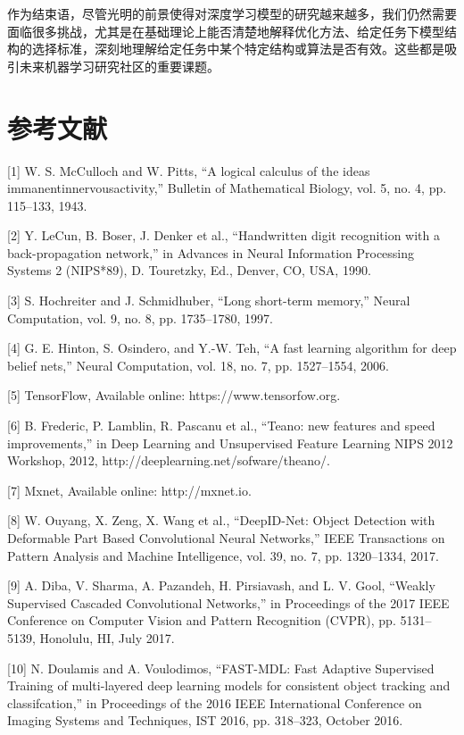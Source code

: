 \documentclass[a4paper]{article}
\begin{document}
作为结束语，尽管光明的前景使得对深度学习模型的研究越来越多，我们仍然需要面临很多挑战，尤其是在基础理论上能否清楚地解释优化方法、给定任务下模型结构的选择标准，深刻地理解给定任务中某个特定结构或算法是否有效。这些都是吸引未来机器学习研究社区的重要课题。

\section*{参考文献}

[1] W. S. McCulloch and W. Pitts, “A logical calculus of the ideas
immanentinnervousactivity,” Bulletin of Mathematical Biology,
vol. 5, no. 4, pp. 115–133, 1943.


[2] Y. LeCun, B. Boser, J. Denker et al., “Handwritten digit recognition with a back-propagation network,” in Advances in Neural
Information Processing Systems 2 (NIPS*89), D. Touretzky, Ed.,
Denver, CO, USA, 1990.


[3] S. Hochreiter and J. Schmidhuber, “Long short-term memory,”
Neural Computation, vol. 9, no. 8, pp. 1735–1780, 1997.


[4] G. E. Hinton, S. Osindero, and Y.-W. Teh, “A fast learning
algorithm for deep belief nets,” Neural Computation, vol. 18, no.
7, pp. 1527–1554, 2006.


[5] TensorFlow, Available online: https://www.tensorfow.org.


[6] B. Frederic, P. Lamblin, R. Pascanu et al., “Teano: new features
and speed improvements,” in Deep Learning and Unsupervised Feature Learning NIPS 2012 Workshop, 2012, http://deeplearning.net/sofware/theano/.


[7] Mxnet, Available online: http://mxnet.io.


[8] W. Ouyang, X. Zeng, X. Wang et al., “DeepID-Net: Object
Detection with Deformable Part Based Convolutional Neural
Networks,” IEEE Transactions on Pattern Analysis and Machine
Intelligence, vol. 39, no. 7, pp. 1320–1334, 2017.


[9] A. Diba, V. Sharma, A. Pazandeh, H. Pirsiavash, and L. V. Gool,
“Weakly Supervised Cascaded Convolutional Networks,” in
Proceedings of the 2017 IEEE Conference on Computer Vision and
Pattern Recognition (CVPR), pp. 5131–5139, Honolulu, HI, July
2017.


[10] N. Doulamis and A. Voulodimos, “FAST-MDL: Fast Adaptive
Supervised Training of multi-layered deep learning models for
consistent object tracking and classifcation,” in Proceedings of
the 2016 IEEE International Conference on Imaging Systems and
Techniques, IST 2016, pp. 318–323, October 2016.
\end{document}
